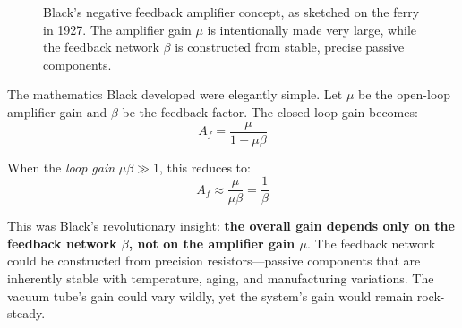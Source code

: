 \begin{figure}[htbp]
\centering
{}
\caption{Black's negative feedback amplifier concept, as sketched on the ferry in 1927. The amplifier gain $\mu$ is intentionally made very large, while the feedback network $\beta$ is constructed from stable, precise passive components.}
\label{fig:black_original}
\end{figure}

The mathematics Black developed were elegantly simple. Let $\mu$ be the open-loop amplifier gain and $\beta$ be the feedback factor. The closed-loop gain becomes:
\begin{equation}
A_f = \frac{\mu}{1 + \mu\beta}
\label{eq:black_formula}
\end{equation}

When the \textit{loop gain} $\mu\beta \gg 1$, this reduces to:
\begin{equation}
A_f \approx \frac{\mu}{\mu\beta} = \frac{1}{\beta}
\label{eq:black_approximation}
\end{equation}

This was Black's revolutionary insight: \textbf{the overall gain depends only on the feedback network $\beta$, not on the amplifier gain $\mu$}. The feedback network could be constructed from precision resistors---passive components that are inherently stable with temperature, aging, and manufacturing variations. The vacuum tube's gain could vary wildly, yet the system's gain would remain rock-steady.


